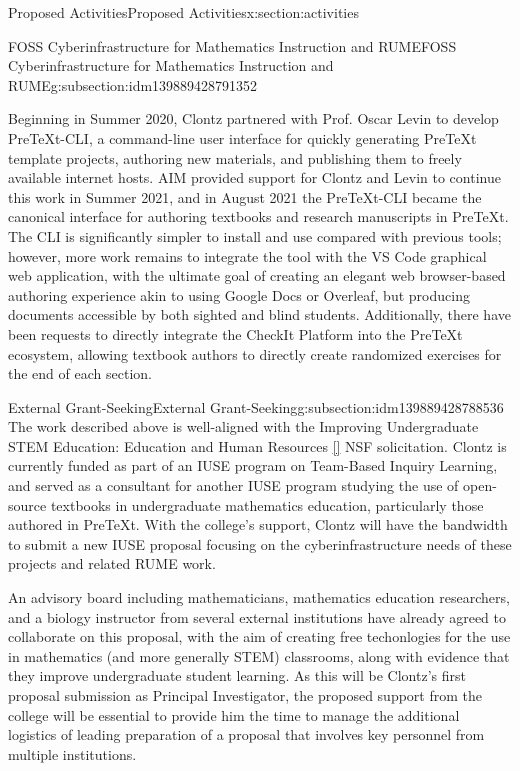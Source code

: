 \documentclass[oneside,10pt,]{article}
\newcommand{\xreffont}{\relax}
\begin{document}
\begin{sectionptx}{Proposed Activities}{}{Proposed Activities}{}{}{x:section:activities}
\begin{subsectionptx}{FOSS Cyberinfrastructure for Mathematics Instruction and RUME}{}{FOSS Cyberinfrastructure for Mathematics Instruction and RUME}{}{}{g:subsection:idm139889428791352}
\par
Beginning in Summer 2020, Clontz partnered with Prof. Oscar Levin to develop PreTeXt-CLI, a command-line user interface for quickly generating PreTeXt template projects, authoring new materials, and publishing them to freely available internet hosts. AIM provided support for Clontz and Levin to continue this work in Summer 2021, and in August 2021 the PreTeXt-CLI became the canonical interface for authoring textbooks and research manuscripts in PreTeXt. The CLI is significantly simpler to install and use compared with previous tools; however, more work remains to integrate the tool with the VS Code graphical web application, with the ultimate goal of creating an elegant web browser-based authoring experience akin to using Google Docs or Overleaf, but producing documents accessible by both sighted and blind students. Additionally, there have been requests to directly integrate the CheckIt Platform into the PreTeXt ecosystem, allowing textbook authors to directly create randomized exercises for the end of each section.%
\end{subsectionptx}
%
%
\typeout{************************************************}
\typeout{************************************************}
%
\begin{subsectionptx}{External Grant-Seeking}{}{External Grant-Seeking}{}{}{g:subsection:idm139889428788536}
The work described above is well-aligned with the Improving Undergraduate STEM Education: Education and Human Resources \hyperlink{x:biblio:biblio-iuse}{[{\xreffont 21}]} NSF solicitation. Clontz is currently funded as part of an IUSE program on Team-Based Inquiry Learning, and served as a consultant for another IUSE program studying the use of open-source textbooks in undergraduate mathematics education, particularly those authored in PreTeXt. With the college's support, Clontz will have the bandwidth to submit a new IUSE proposal focusing on the cyberinfrastructure needs of these projects and related RUME work.%
\par
An advisory board including mathematicians, mathematics education researchers, and a biology instructor from several external institutions have already agreed to collaborate on this proposal, with the aim of creating free techonlogies for the use in mathematics (and more generally STEM) classrooms, along with evidence that they improve undergraduate student learning. As this will be Clontz's first proposal submission as Principal Investigator, the proposed support from the college will be essential to provide him the time to manage the additional logistics of leading preparation of a proposal that involves key personnel from multiple institutions.%
\end{subsectionptx}
\end{sectionptx}
\end{document}
